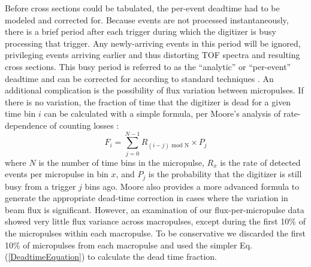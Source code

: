 \documentclass[twocolumn,secnumarabic,amssymb, nobibnotes, aps, prl,
superscriptaddress, nobalancelastpage]{revtex4}
\begin{document}
Before cross sections could be tabulated, the per-event deadtime had to be
modeled and corrected for. Because events are not processed
instantaneously, there is a brief period
after each trigger during which the digitizer is busy processing that trigger.
Any newly-arriving events in this period will be ignored,
privileging events arriving earlier and thus distorting
TOF spectra and resulting cross sections. This busy period is referred to as the
``analytic'' or ``per-event'' deadtime and can be corrected for according to standard 
techniques
\cite{Moore1980}. An additional complication is the possibility of flux
variation between micropulses. If there is no variation, the fraction of time
that the digitizer is dead for a given time bin $i$ can be calculated with a
simple formula, per Moore's analysis of rate-dependence of counting losses
\cite{Moore1980}:
\begin{equation}
    F_{i} = \sum^{N-1}_{j=0} R_{(i-j)\text{ mod N}}\times P_{j}
    \label{DeadtimeEquation}
\end{equation}
where $N$ is the number of time bins in the micropulse, $R_{x}$ is the rate of
detected events per micropulse in bin $x$, and $P_{j}$ is the probability that the
digitizer is still busy from a trigger $j$ bins ago.
Moore also provides a more advanced formula to generate the appropriate
dead-time correction in cases where the variation in beam flux 
is significant. However, an examination of our flux-per-micropulse data showed
very little flux variance across macropulses, except during the first 10\%
of the micropulses within each macropulse. To be conservative we discarded the
first 10\% of micropulses from each macropulse and used the simpler Eq.
(\ref{DeadtimeEquation}) to calculate the dead time fraction.
\end{document}

